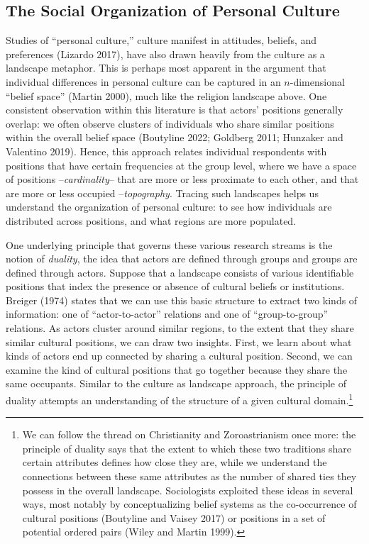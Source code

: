 \documentclass[
  11pt,
]{article}
\begin{document}
\hypertarget{the-social-organization-of-personal-culture}{%
\subsection{The Social Organization of Personal
Culture}\label{the-social-organization-of-personal-culture}}

Studies of ``personal culture,'' culture manifest in attitudes, beliefs,
and preferences (Lizardo 2017), have also drawn heavily from the culture
as a landscape metaphor. This is perhaps most apparent in the argument
that individual differences in personal culture can be captured in an
\(n\)-dimensional ``belief space'' (Martin 2000), much like the religion
landscape above. One consistent observation within this literature is
that actors' positions generally overlap: we often observe clusters of
individuals who share similar positions within the overall belief space
(Boutyline 2022; Goldberg 2011; Hunzaker and Valentino 2019). Hence,
this approach relates individual respondents with positions that have
certain frequencies at the group level, where we have a space of
positions --\emph{cardinality}-- that are more or less proximate to each
other, and that are more or less occupied --\emph{topography}. Tracing
such landscapes helps us understand the organization of personal
culture: to see how individuals are distributed across positions, and
what regions are more populated.

One underlying principle that governs these various research streams is
the notion of \emph{duality}, the idea that actors are defined through
groups and groups are defined through actors. Suppose that a landscape
consists of various identifiable positions that index the presence or
absence of cultural beliefs or institutions. Breiger (1974) states that
we can use this basic structure to extract two kinds of information: one
of ``actor-to-actor'' relations and one of ``group-to-group'' relations.
As actors cluster around similar regions, to the extent that they share
similar cultural positions, we can draw two insights. First, we learn
about what kinds of actors end up connected by sharing a cultural
position. Second, we can examine the kind of cultural positions that go
together because they share the same occupants. Similar to the culture
as landscape approach, the principle of duality attempts an
understanding of the structure of a given cultural domain.\footnote{We
  can follow the thread on Christianity and Zoroastrianism once more:
  the principle of duality says that the extent to which these two
  traditions share certain attributes defines how close they are, while
  we understand the connections between these same attributes as the
  number of shared ties they possess in the overall landscape.
  Sociologists exploited these ideas in several ways, most notably by
  conceptualizing belief systems as the co-occurrence of cultural
  positions (Boutyline and Vaisey 2017) or positions in a set of
  potential ordered pairs (Wiley and Martin 1999).}
\end{document}

